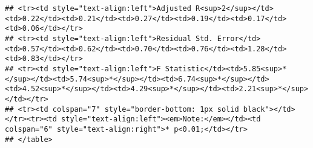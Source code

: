 \documentclass[
]{article}
\begin{document}
\begin{verbatim}
## <tr><td style="text-align:left">Adjusted R<sup>2</sup></td><td>0.22</td><td>0.21</td><td>0.27</td><td>0.19</td><td>0.17</td><td>0.06</td></tr>
## <tr><td style="text-align:left">Residual Std. Error</td><td>0.57</td><td>0.62</td><td>0.70</td><td>0.76</td><td>1.28</td><td>0.83</td></tr>
## <tr><td style="text-align:left">F Statistic</td><td>5.85<sup>*</sup></td><td>5.74<sup>*</sup></td><td>6.74<sup>*</sup></td><td>4.52<sup>*</sup></td><td>4.29<sup>*</sup></td><td>2.21<sup>*</sup></td></tr>
## <tr><td colspan="7" style="border-bottom: 1px solid black"></td></tr><tr><td style="text-align:left"><em>Note:</em></td><td colspan="6" style="text-align:right">* p<0.01;</td></tr>
## </table>
\end{verbatim}
\end{document}
